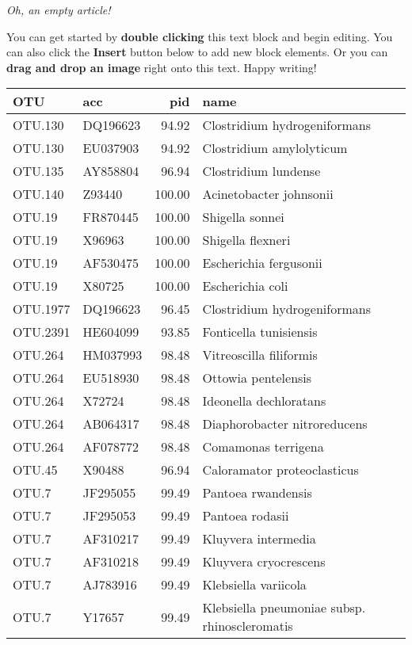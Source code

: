 \textit{Oh, an empty article!} 

You can get started by \textbf{double clicking} this text block and begin editing. You can also click the \textbf{Insert} button below to add new block elements. Or you can \textbf{drag and drop an image} right onto this text. Happy writing!

\begin{tabular}{llrl}
  \hline
OTU & acc & pid & name \\ 
  \hline
  OTU.130 & DQ196623 & 94.92 & Clostridium hydrogeniformans \\ 
  OTU.130 & EU037903 & 94.92 & Clostridium amylolyticum \\ 
  OTU.135 & AY858804 & 96.94 & Clostridium lundense \\ 
  OTU.140 & Z93440 & 100.00 & Acinetobacter johnsonii \\ 
  OTU.19 & FR870445 & 100.00 & Shigella sonnei \\ 
  OTU.19 & X96963 & 100.00 & Shigella flexneri \\ 
  OTU.19 & AF530475 & 100.00 & Escherichia fergusonii \\ 
  OTU.19 & X80725 & 100.00 & Escherichia coli \\ 
  OTU.1977 & DQ196623 & 96.45 & Clostridium hydrogeniformans \\ 
  OTU.2391 & HE604099 & 93.85 & Fonticella tunisiensis \\ 
  OTU.264 & HM037993 & 98.48 & Vitreoscilla filiformis \\ 
  OTU.264 & EU518930 & 98.48 & Ottowia pentelensis \\ 
  OTU.264 & X72724 & 98.48 & Ideonella dechloratans \\ 
  OTU.264 & AB064317 & 98.48 & Diaphorobacter nitroreducens \\ 
  OTU.264 & AF078772 & 98.48 & Comamonas terrigena \\ 
  OTU.45 & X90488 & 96.94 & Caloramator proteoclasticus \\ 
  OTU.7 & JF295055 & 99.49 & Pantoea rwandensis \\ 
  OTU.7 & JF295053 & 99.49 & Pantoea rodasii \\ 
  OTU.7 & AF310217 & 99.49 & Kluyvera intermedia \\ 
  OTU.7 & AF310218 & 99.49 & Kluyvera cryocrescens \\ 
  OTU.7 & AJ783916 & 99.49 & Klebsiella variicola \\ 
  OTU.7 & Y17657 & 99.49 & Klebsiella pneumoniae subsp. rhinoscleromatis \\ 

\end{tabular}
